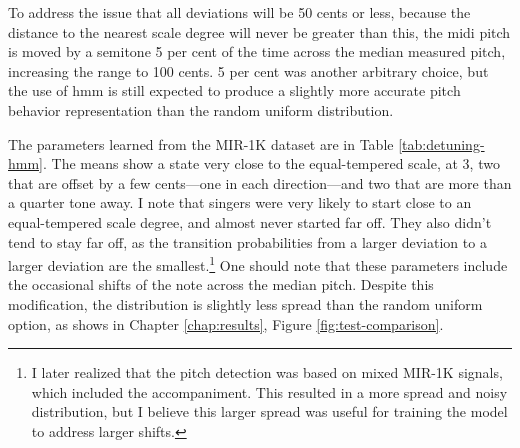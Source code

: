 To address the issue that all deviations will be 50 cents or less, because the distance to the nearest scale degree will never be greater than this, the \gls{midi} pitch is moved by a semitone 5 per cent of the time across the median measured pitch, increasing the range to 100 cents. 5 per cent was another arbitrary choice, but the use of \gls{hmm} is still expected to produce a slightly more accurate pitch behavior representation than the random uniform distribution.

The parameters learned from the MIR-1K dataset are in Table \ref{tab:detuning-hmm}. The means show a state very close to the equal-tempered scale, at 3, two that are offset by a few cents---one in each direction---and two that are more than a quarter tone away. I note that singers were very likely to start close to an equal-tempered scale degree, and almost never started far off. They also didn't tend to stay far off, as the transition probabilities from a larger deviation to a larger deviation are the smallest.\footnote{I later realized that the pitch detection was based on mixed MIR-1K signals, which included the accompaniment. This resulted in a more spread and noisy distribution, but I believe this larger spread was useful for training the model to address larger shifts.} One should note that these parameters include the occasional shifts of the note across the median pitch. Despite this modification, the distribution is slightly less spread than the random uniform option, as shows in Chapter \ref{chap:results}, Figure \ref{fig:test-comparison}.

